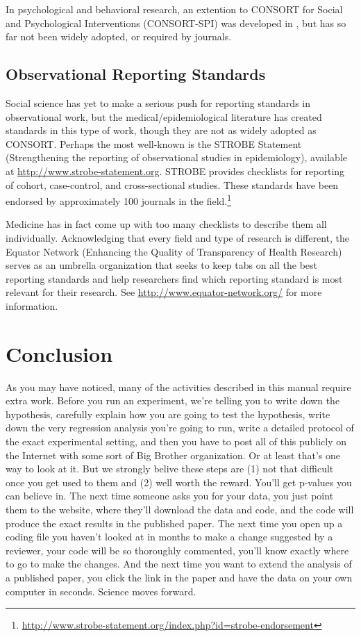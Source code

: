 \documentclass[12pt] {article}
\begin{document}
In psychological and behavioral research, an extention to CONSORT for Social and Psychological Interventions (CONSORT-SPI) was developed in \citep{montgomery2013protocol}, but has so far not been widely adopted, or required by journals. 

\subsection{Observational Reporting Standards}\label{observational-standards}
Social science has yet to make a serious push for reporting standards in observational work, but the medical/epidemiological literature has created standards in this type of work, though they are not as widely adopted as CONSORT. Perhaps the most well-known is the STROBE Statement (Strengthening the reporting of observational studies in epidemiology), available at \url{http://www.strobe-statement.org}. STROBE provides checklists for reporting of cohort, case-control, and cross-sectional studies. These standards have been endorsed by approximately 100 journals in the field.\footnote{\url{http://www.strobe-statement.org/index.php?id=strobe-endorsement}}

Medicine has in fact come up with too many checklists to describe them all individually. Acknowledging that every field and type of research is different, the Equator Network (Enhancing the Quality of Transparency of Health Research) serves as an umbrella organization that seeks to keep tabs on all the best reporting standards and help researchers find which reporting standard is most relevant for their research. See \url{http://www.equator-network.org/} for more information.





\section{Conclusion}\label{conclusion}

As you may have noticed, many of the activities described in this manual
require extra work. Before you run an experiment, we're telling you to
write down the hypothesis, carefully explain how you are going to test
the hypothesis, write down the very regression analysis you're going to
run, write a detailed protocol of the exact experimental setting, and
then you have to post all of this publicly on the Internet with some
sort of Big Brother organization. Or at least that's one way to look at
it. But we strongly belive these steps are (1) not that difficult once
you get used to them and (2) well worth the reward. You'll get p-values
you can believe in. The next time someone asks you for your data, you
just point them to the website, where they'll download the data and
code, and the code will produce the exact results in the published
paper. The next time you open up a coding file you haven't looked at in
months to make a change suggested by a reviewer, your code will be so
thoroughly commented, you'll know exactly where to go to make the
changes. And the next time you want to extend the analysis of a
published paper, you click the link in the paper and have the data on
your own computer in seconds. Science moves forward.
\end{document}
